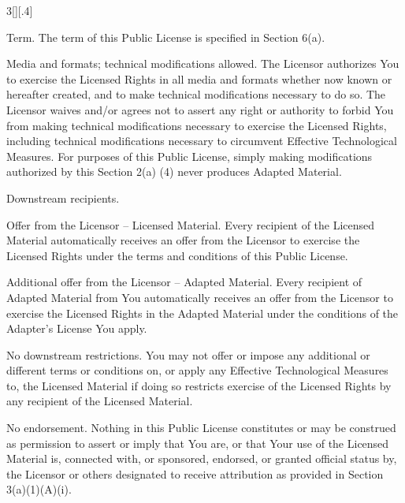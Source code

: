 \documentclass[8pt,a4paper]{article}
\begin{document}
\begin{multicols}{3}[][.4\paperwidth]
\begin{longenum}
\begin{longenum}
\begin{longenum}
       \item Term. The term of this Public License is specified in Section
          6(a).

       \item Media and formats; technical modifications allowed. The
          Licensor authorizes You to exercise the Licensed Rights in
          all media and formats whether now known or hereafter created,
          and to make technical modifications necessary to do so. The
          Licensor waives and/or agrees not to assert any right or
          authority to forbid You from making technical modifications
          necessary to exercise the Licensed Rights, including
          technical modifications necessary to circumvent Effective
          Technological Measures. For purposes of this Public License,
          simply making modifications authorized by this Section 2(a)
          (4) never produces Adapted Material.

       \item Downstream recipients.

            \begin{longenum}

            \item Offer from the Licensor -- Licensed Material. Every
               recipient of the Licensed Material automatically
               receives an offer from the Licensor to exercise the
               Licensed Rights under the terms and conditions of this
               Public License.

            \item Additional offer from the Licensor -- Adapted Material.
               Every recipient of Adapted Material from You
               automatically receives an offer from the Licensor to
               exercise the Licensed Rights in the Adapted Material
               under the conditions of the Adapter's License You apply.

            \item No downstream restrictions. You may not offer or impose
               any additional or different terms or conditions on, or
               apply any Effective Technological Measures to, the
               Licensed Material if doing so restricts exercise of the
               Licensed Rights by any recipient of the Licensed
               Material.

            \end{longenum}

       \item No endorsement. Nothing in this Public License constitutes or
          may be construed as permission to assert or imply that You
          are, or that Your use of the Licensed Material is, connected
          with, or sponsored, endorsed, or granted official status by,
          the Licensor or others designated to receive attribution as
          provided in Section 3(a)(1)(A)(i).


\end{longenum}
\end{longenum}
\end{longenum}
\end{multicols}
\end{document}
